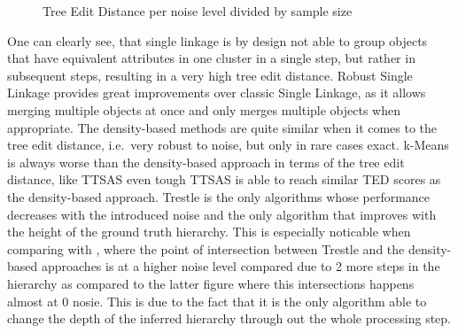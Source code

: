  \begin{figure}
\centering
{}
\caption{Tree Edit Distance per noise level divided by sample size} \label{fig:tednorm}
\end{figure}

\noindent One can clearly see, that single linkage is by design not able to group objects that have equivalent attributes in one cluster in a single step, but rather in subsequent steps, resulting in a very high tree edit distance. Robust Single Linkage provides great improvements over classic Single Linkage, as it allows merging multiple objects at once and only merges multiple objects when appropriate. The density-based methods are quite similar when it comes to the tree edit distance, i.e.~very robust to noise, but only in rare cases exact. k-Means is always worse than the density-based approach in terms of the tree edit distance, like TTSAS even tough TTSAS is able to reach similar TED scores as the density-based approach. Trestle is the only algorithms whose performance decreases with the introduced noise and the only algorithm that improves with the height of the ground truth hierarchy. This is especially noticable when comparing  with , where the point of intersection between Trestle and the density-based approaches is at a higher noise level compared due to 2 more steps in the hierarchy as compared to the latter figure where this intersections happens almost at 0 nosie. This is due to the fact that it is the only algorithm able to change the depth of the inferred hierarchy through out the whole processing step. 

